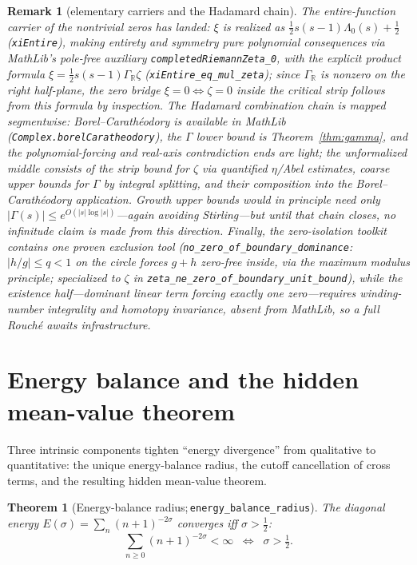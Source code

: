\documentclass[submission]{jsfds}
\newtheorem{theorem}{Theorem}
\newtheorem*{remark}{Remark}
\newcommand{\Lean}[1]{\texttt{#1}}
\newcommand{\abs}[1]{\lvert #1\rvert}
\begin{document}
\begin{remark}[elementary carriers and the Hadamard chain]
\label{remark:xientire}
The entire-function carrier of the nontrivial zeros has landed:
$\xi$ is realized as $\tfrac12 s(s-1)\Lambda_{0}(s)+\tfrac12$
(\Lean{xiEntire}), making entirety and symmetry pure polynomial consequences
via MathLib's pole-free auxiliary \Lean{completedRiemannZeta_0}, with the
explicit product formula $\xi=\tfrac12 s(s-1)\Gamma_{\mathbb{R}}\zeta$
(\Lean{xiEntire_eq_mul_zeta}); since $\Gamma_{\mathbb{R}}$ is nonzero on the
right half-plane, the zero bridge $\xi=0\Longleftrightarrow\zeta=0$ inside the
critical strip follows from this formula by inspection. The Hadamard combination
chain is mapped segmentwise: Borel--Carath\'eodory is available in MathLib
(\Lean{Complex.borelCaratheodory}), the $\Gamma$ lower bound is
Theorem~\ref{thm:gamma}, and the polynomial-forcing and real-axis contradiction
ends are light; the unformalized middle consists of the strip bound for $\zeta$
via quantified $\eta$/Abel estimates, coarse upper bounds for $\Gamma$ by
integral splitting, and their composition into the Borel--Carath\'eodory
application. Growth upper bounds would in principle need only
$\abs{\Gamma(s)}\leq e^{O(\abs{s}\log\abs{s})}$---again avoiding Stirling---but
until that chain closes, no infinitude claim is made from this direction.
Finally, the zero-isolation toolkit contains one proven exclusion tool
(\Lean{no_zero_of_boundary_dominance}: $\abs{h/g}\leq q<1$ on the circle forces
$g+h$ zero-free inside, via the maximum modulus principle; specialized to
$\zeta$ in \Lean{zeta_ne_zero_of_boundary_unit_bound}), while the existence
half---dominant linear term forcing exactly one zero---requires
winding-number integrality and homotopy invariance, absent from MathLib, so a
full Rouch\'e awaits infrastructure.
\end{remark}

\section{Energy balance and the hidden mean-value theorem}\label{sec:balance}

Three intrinsic components tighten ``energy divergence'' from qualitative
to quantitative: the unique energy-balance radius, the cutoff cancellation
of cross terms, and the resulting hidden mean-value theorem.

\begin{theorem}[Energy-balance radius;\,\Lean{energy_balance_radius}]
\label{thm:balance}
The diagonal energy $E(\sigma)=\sum_n (n+1)^{-2\sigma}$ converges iff $\sigma>\tfrac12$:
\[
  \sum_{n\geq 0} (n+1)^{-2\sigma} < \infty \;\;\Longleftrightarrow\;\; \sigma > \tfrac12 .
\]
\end{theorem}
\end{document}
